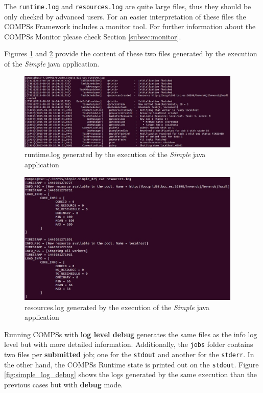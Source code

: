 The \texttt{runtime.log} and \texttt{resources.log} are quite large files, thus they should be only checked by advanced users. For an
easier interpretation of these files the COMPSs Framework includes a monitor tool. For further information about the COMPSs Monitor
please check Section \ref{subsec:monitor}.

Figures \ref{fig:simple_runtimelog} and \ref{fig:simple_resourceslog} provide the content of these two files generated
by the execution of the \textit{Simple} java application. 
\begin{figure}[!ht]
  \centering
    \includegraphics[width=0.95\textwidth]{./Sections/3_Results_and_Logs/Figures/simple_runtimelog.jpeg}
    \caption{runtime.log generated by the execution of the \textit{Simple} java application}
    \label{fig:simple_runtimelog}
\end{figure}

\begin{figure}[!ht]
  \centering
    \includegraphics[width=0.95\textwidth]{./Sections/3_Results_and_Logs/Figures/simple_resourceslog.jpeg}
    \caption{resources.log generated by the execution of the \textit{Simple} java application}
    \label{fig:simple_resourceslog}
\end{figure}

Running COMPSs with \textbf{log level debug} generates the same files as the info log level but with more detailed information.
Additionally, the \texttt{jobs} folder contains two files per \textbf{submitted} job; one for the \texttt{stdout} and another for
the \texttt{stderr}. In the other hand, the COMPSs Runtime state is printed out on the \texttt{stdout}. Figure 
\ref{fig:simple_log_debug} shows the logs generated by the same execution than the previous cases 
but with \textbf{debug} mode. 

